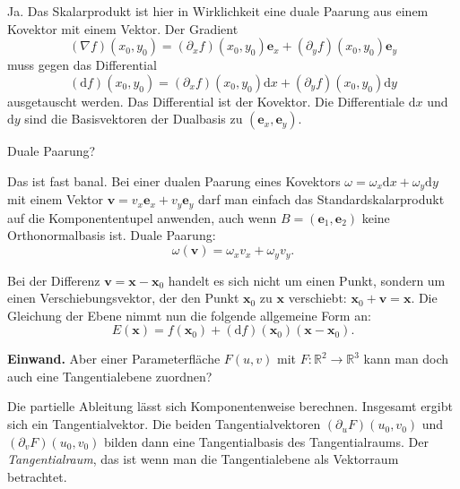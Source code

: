 \documentclass{beamer}
\newcommand{\R}{\mathbb R}
\begin{document}
\begin{frame}
Ja. Das Skalarprodukt ist hier in Wirklichkeit eine duale Paarung aus
einem Kovektor mit einem Vektor. Der Gradient
\[(\nabla f)(x_0,y_0) = (\partial_x f)(x_0,y_0)\mathbf e_x + (\partial_y f)(x_0,y_0)\mathbf e_y\]
muss gegen das Differential
\[(\mathrm df)(x_0,y_0) = (\partial_x f)(x_0,y_0)\mathrm dx + (\partial_y f)(x_0,y_0)\mathrm dy\]
ausgetauscht werden. Das Differential ist der Kovektor.
Die Differentiale $\mathrm dx$ und $\mathrm dy$
sind die Basisvektoren der Dualbasis zu $(\mathbf e_x,\mathbf e_y)$.
\end{frame}

\begin{frame}
Duale Paarung?
\end{frame}

\begin{frame}
Das ist fast banal. Bei einer dualen Paarung eines Kovektors
$\omega=\omega_x\mathrm dx+\omega_y\mathrm dy$ mit
einem Vektor $\mathbf v = v_x\mathbf e_x+v_y\mathbf e_y$ darf man einfach
das Standardskalarprodukt auf die Komponententupel anwenden, auch
wenn $B=(\mathbf e_1,\mathbf e_2)$ keine Orthonormalbasis ist.
Duale Paarung:
\[\omega(\mathbf v) = \omega_x v_x+\omega_y v_y.\]
\end{frame}

\begin{frame}
Bei der Differenz $\mathbf v=\mathbf x-\mathbf x_0$ handelt es sich nicht
um einen Punkt, sondern um einen Verschiebungsvektor, der den Punkt
$\mathbf x_0$ zu $\mathbf x$ verschiebt: $\mathbf x_0+\mathbf v = \mathbf x$.
Die Gleichung der Ebene nimmt nun die folgende allgemeine Form an:
\[E(\mathbf x) = f(\mathbf x_0) + (\mathrm df)(\mathbf x_0)(\mathbf x-\mathbf x_0).\]
\end{frame}

\begin{frame}
\textbf{Einwand.} Aber einer Parameterfläche $F(u,v)$ mit
$F\colon\R^2\to\R^3$ kann man doch auch eine Tangentialebene zuordnen?
\end{frame}

\begin{frame}
Die partielle Ableitung lässt sich Komponentenweise berechnen.
Insgesamt ergibt sich ein Tangentialvektor. Die beiden
Tangentialvektoren $(\partial_u F)(u_0,v_0)$ und $(\partial_v F)(u_0,v_0)$
bilden dann eine Tangentialbasis des Tangentialraums. Der
\emph{Tangentialraum}, das ist wenn man die Tangentialebene als
Vektorraum betrachtet.
\end{frame}
\end{document}
